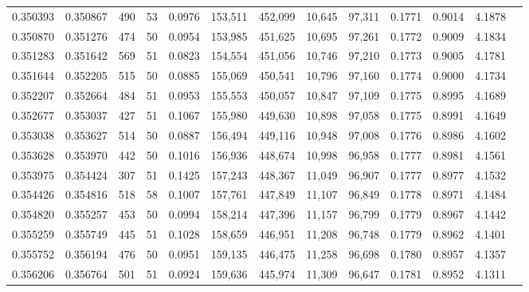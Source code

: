 \begin{tabular}{rrrrrrrrrrrrr}
0.350393 & 0.350867 &   490 &  53 &                                     0.0976 & 153,511 & 452,099 &  10,645 &  97,311 & 0.1771 & 0.9014 & 4.1878 \\
0.350870 & 0.351276 &   474 &  50 &                                     0.0954 & 153,985 & 451,625 &  10,695 &  97,261 & 0.1772 & 0.9009 & 4.1834 \\
0.351283 & 0.351642 &   569 &  51 &                                     0.0823 & 154,554 & 451,056 &  10,746 &  97,210 & 0.1773 & 0.9005 & 4.1781 \\
0.351644 & 0.352205 &   515 &  50 &                                     0.0885 & 155,069 & 450,541 &  10,796 &  97,160 & 0.1774 & 0.9000 & 4.1734 \\
0.352207 & 0.352664 &   484 &  51 &                                     0.0953 & 155,553 & 450,057 &  10,847 &  97,109 & 0.1775 & 0.8995 & 4.1689 \\
0.352677 & 0.353037 &   427 &  51 &                                     0.1067 & 155,980 & 449,630 &  10,898 &  97,058 & 0.1775 & 0.8991 & 4.1649 \\
0.353038 & 0.353627 &   514 &  50 &                                     0.0887 & 156,494 & 449,116 &  10,948 &  97,008 & 0.1776 & 0.8986 & 4.1602 \\
0.353628 & 0.353970 &   442 &  50 &                                     0.1016 & 156,936 & 448,674 &  10,998 &  96,958 & 0.1777 & 0.8981 & 4.1561 \\
0.353975 & 0.354424 &   307 &  51 &                                     0.1425 & 157,243 & 448,367 &  11,049 &  96,907 & 0.1777 & 0.8977 & 4.1532 \\
0.354426 & 0.354816 &   518 &  58 &                                     0.1007 & 157,761 & 447,849 &  11,107 &  96,849 & 0.1778 & 0.8971 & 4.1484 \\
0.354820 & 0.355257 &   453 &  50 &                                     0.0994 & 158,214 & 447,396 &  11,157 &  96,799 & 0.1779 & 0.8967 & 4.1442 \\
0.355259 & 0.355749 &   445 &  51 &                                     0.1028 & 158,659 & 446,951 &  11,208 &  96,748 & 0.1779 & 0.8962 & 4.1401 \\
0.355752 & 0.356194 &   476 &  50 &                                     0.0951 & 159,135 & 446,475 &  11,258 &  96,698 & 0.1780 & 0.8957 & 4.1357 \\
0.356206 & 0.356764 &   501 &  51 &                                     0.0924 & 159,636 & 445,974 &  11,309 &  96,647 & 0.1781 & 0.8952 & 4.1311 \\

\end{tabular}
